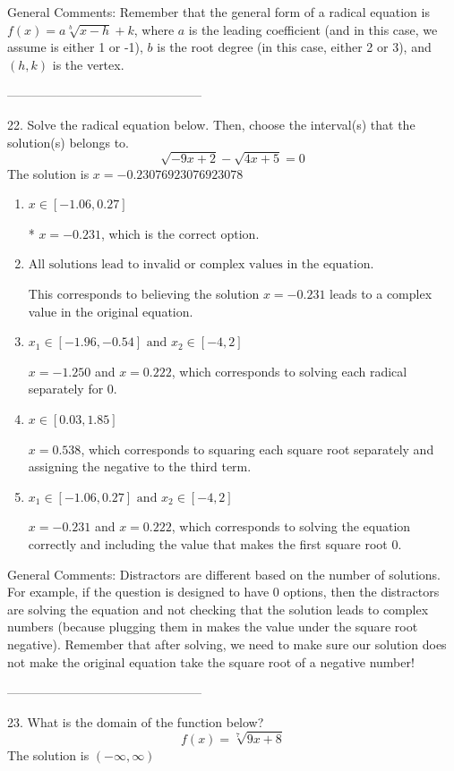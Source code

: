 \documentclass{article}[14pt]
\begin{document}
General Comments: Remember that the general form of a radical equation is $ f(x) = a \sqrt[b]{x - h} + k $, where $a$ is the leading coefficient (and in this case, we assume is either 1 or -1), $b$ is the root degree (in this case, either 2 or 3), and $(h, k)$ is the vertex.

-----------------------------------------------

22. Solve the radical equation below. Then, choose the interval(s) that the solution(s) belongs to.
$$ \sqrt{-9 x + 2} - \sqrt{4 x + 5} = 0 $$ 
The solution is $ x = -0.23076923076923078 $ 

\begin{enumerate}[label=\Alph*.] 
\item $ x \in [-1.06,0.27] $ 

 * $x = -0.231$, which is the correct option. 
\item $ \text{All solutions lead to invalid or complex values in the equation.} $ 

 This corresponds to believing the solution $x = -0.231$ leads to a complex value in the original equation. 
\item $ x_1 \in [-1.96, -0.54] \text{ and } x_2 \in [-4,2] $ 

 $x = -1.250$ and $x = 0.222$, which corresponds to solving each radical separately for 0. 
\item $ x \in [0.03,1.85] $ 

 $x = 0.538$, which corresponds to squaring each square root separately and assigning the negative to the third term. 
\item $ x_1 \in [-1.06, 0.27] \text{ and } x_2 \in [-4,2] $ 

 $x = -0.231$ and $x = 0.222$, which corresponds to solving the equation correctly and including the value that makes the first square root 0. 
\end{enumerate} 
 
General Comments: Distractors are different based on the number of solutions. For example, if the question is designed to have 0 options, then the distractors are solving the equation and not checking that the solution leads to complex numbers (because plugging them in makes the value under the square root negative). Remember that after solving, we need to make sure our solution does not make the original equation take the square root of a negative number!

-----------------------------------------------

23. What is the domain of the function below?
$$ f(x) = \sqrt[7]{9 x + 8} $$ 
The solution is $ (-\infty, \infty) $ 
\end{document}
